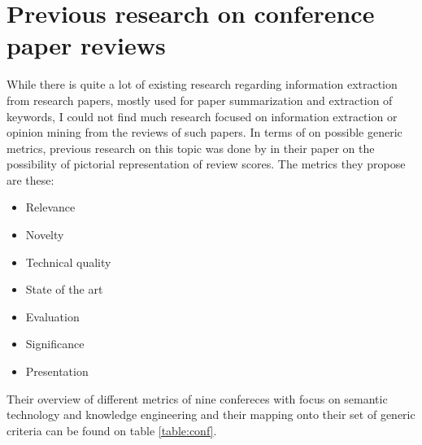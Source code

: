 \section{Previous research on conference paper reviews}
While there is quite a lot of existing research regarding information extraction from research papers, mostly used for paper summarization and extraction of keywords, I could not find much research focused on information extraction or opinion mining from the reviews of such papers. 
In terms of  on possible generic metrics, previous research on this topic was done by \textcite{svatek_strossa} in their paper on the possibility of pictorial representation of review scores. The metrics they propose are these:
\begin{itemize}
    \item Relevance
    \item Novelty
    \item Technical quality
    \item State of the art
    \item Evaluation
    \item Significance
    \item Presentation
\end{itemize}
Their overview of different metrics of nine confereces with focus on semantic technology and knowledge engineering and their mapping onto their set of generic criteria can be found on table \ref{table:conf}.
